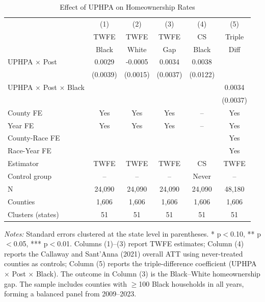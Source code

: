 
\begin{table}[H]
\centering
\caption{Effect of UPHPA on Homeownership Rates}
\label{tab:main}
\begin{threeparttable}
\begin{tabular}{lccccc}
\toprule
 & (1) & (2) & (3) & (4) & (5) \\
 & TWFE & TWFE & TWFE & CS & Triple \\
 & Black & White & Gap & Black & Diff \\
\midrule
UPHPA $\times$ Post & 0.0029 & -0.0005 & 0.0034 & 0.0038 &  \\
 & (0.0039) & (0.0015) & (0.0037) & (0.0122) &  \\[0.5em]
UPHPA $\times$ Post $\times$ Black & & & & & 0.0034 \\
 & & & & & (0.0037) \\[0.5em]
\midrule
County FE & Yes & Yes & Yes & -- & Yes \\
Year FE & Yes & Yes & Yes & -- & Yes \\
County-Race FE & & & & & Yes \\
Race-Year FE & & & & & Yes \\
Estimator & TWFE & TWFE & TWFE & CS & TWFE \\
Control group & -- & -- & -- & Never & -- \\
N & 24,090 & 24,090 & 24,090 & 24,090 & 48,180 \\
Counties & 1,606 & 1,606 & 1,606 & 1,606 & 1,606 \\
Clusters (states) & 51 & 51 & 51 & 51 & 51 \\
\bottomrule
\end{tabular}
\begin{tablenotes}[flushleft]
\small
\item \textit{Notes:} Standard errors clustered at the state level in parentheses. * p$<$0.10, ** p$<$0.05, *** p$<$0.01. Columns (1)--(3) report TWFE estimates; Column (4) reports the Callaway and Sant'Anna (2021) overall ATT using never-treated counties as controls; Column (5) reports the triple-difference coefficient (UPHPA $\times$ Post $\times$ Black). The outcome in Column (3) is the Black--White homeownership gap. The sample includes counties with $\geq$100 Black households in all years, forming a balanced panel from 2009--2023.
\end{tablenotes}
\end{threeparttable}
\end{table}
